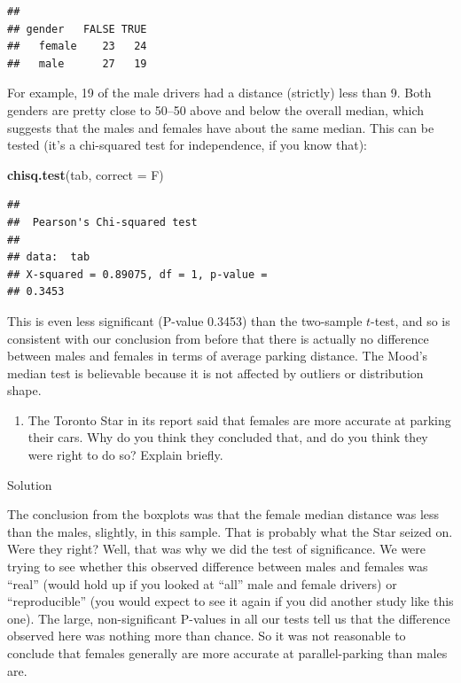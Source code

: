 \documentclass[]{tufte-book}
\newenvironment{Shaded}{}{}
\newcommand{\DataTypeTok}[1]{\textcolor[rgb]{0.56,0.13,0.00}{#1}}
\newcommand{\KeywordTok}[1]{\textcolor[rgb]{0.00,0.44,0.13}{\textbf{#1}}}
\newcommand{\NormalTok}[1]{#1}
\providecommand{\tightlist}{%
  \setlength{\itemsep}{0pt}\setlength{\parskip}{0pt}}
\theoremstyle{definition}
\theoremstyle{definition}
\theoremstyle{definition}
\theoremstyle{remark}
\begin{document}
\begin{verbatim}
##         
## gender   FALSE TRUE
##   female    23   24
##   male      27   19
\end{verbatim}

For example, 19 of the male drivers had a distance (strictly) less than
9. Both genders are pretty close to 50--50 above and below the overall
median, which suggests that the males and females have about the same
median. This can be tested (it's a chi-squared test for independence, if
you know that):

\begin{Shaded}
\begin{Highlighting}[]
\KeywordTok{chisq.test}\NormalTok{(tab, }\DataTypeTok{correct =}\NormalTok{ F)}
\end{Highlighting}
\end{Shaded}

\begin{verbatim}
## 
##  Pearson's Chi-squared test
## 
## data:  tab
## X-squared = 0.89075, df = 1, p-value =
## 0.3453
\end{verbatim}

This is even less significant (P-value 0.3453) than the two-sample
\(t\)-test, and so is consistent with our conclusion from before that
there is actually no difference between males and females in terms of
average parking distance. The Mood's median test is believable because
it is not affected by outliers or distribution shape.

\begin{enumerate}
\def\labelenumi{(\alph{enumi})}
\setcounter{enumi}{6}
\tightlist
\item
  The Toronto Star in its report said that females are more accurate at
  parking their cars. Why do you think they concluded that, and do you
  think they were right to do so? Explain briefly.
\end{enumerate}

Solution

The conclusion from the boxplots was that the female median distance was
less than the males, slightly, in this sample. That is probably what the
Star seized on. Were they right? Well, that was why we did the test of
significance. We were trying to see whether this observed difference
between males and females was ``real'' (would hold up if you looked at
``all'' male and female drivers) or ``reproducible'' (you would expect
to see it again if you did another study like this one). The large,
non-significant P-values in all our tests tell us that the difference
observed here was nothing more than chance. So it was not reasonable to
conclude that females generally are more accurate at parallel-parking
than males are.
\end{document}
